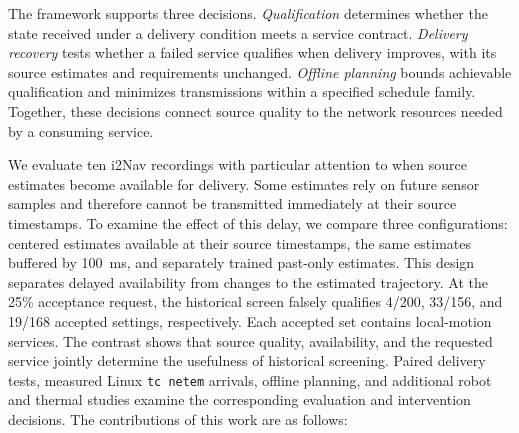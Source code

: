 \documentclass[journal]{IEEEtran}
\newcommand{\revision}[1]{#1}
\newcommand{\secondrev}[1]{{#1}}
\begin{document}
\secondrev{The framework supports three decisions. \emph{Qualification}
determines whether the state received under a delivery condition meets a
service contract. \emph{Delivery recovery} tests whether a failed service
qualifies when delivery improves, with its source estimates and
requirements unchanged. \emph{Offline planning} bounds achievable
qualification and minimizes transmissions within a specified schedule
family. Together, these decisions connect source quality to the network
resources needed by a consuming service.}

\revision{We evaluate ten i2Nav recordings \cite{tang2025i2nav} with particular attention to when source estimates become available for delivery. Some estimates rely on future sensor samples and therefore cannot be transmitted immediately at their source timestamps. To examine the effect of this delay, we compare three configurations: centered estimates available at their source
timestamps, the same estimates buffered by 100~ms, and separately trained
past-only estimates. This design separates delayed availability from
changes to the estimated trajectory. At the 25\% acceptance request,
the historical screen falsely qualifies 4/200, 33/156, and 19/168
accepted settings, respectively. Each accepted set contains local-motion
services. The contrast shows that source quality, availability, and the
requested service jointly determine the usefulness of historical
screening. Paired delivery tests, measured Linux \texttt{tc netem}
arrivals, offline planning, and additional robot and thermal studies
examine the corresponding evaluation and intervention decisions.}
The contributions of this work are as follows:
\end{document}
